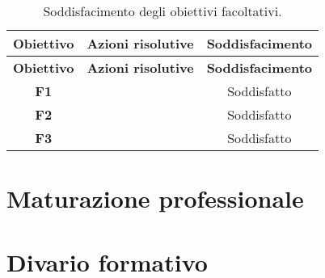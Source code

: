 \begin{longtable}{|c|p{7cm}|c|}
    \caption{Soddisfacimento degli obiettivi facoltativi.}
    \label{tab:soddObbFacoltativi}\\
    \hline \textbf{Obiettivo} & \textbf{Azioni risolutive} & \textbf{Soddisfacimento}\\  \endfirsthead
    \hline \textbf{Obiettivo} & \textbf{Azioni risolutive} & \textbf{Soddisfacimento}\\  \endhead
    \hline \endfoot
    \hline \endlastfoot
    \textbf{F1}  & & Soddisfatto\\
    \hline \textbf{F2}  & & Soddisfatto\\
    \hline \textbf{F3}  & & Soddisfatto\\
\end{longtable}

\section{Maturazione professionale}
%

\section{Divario formativo}
%

